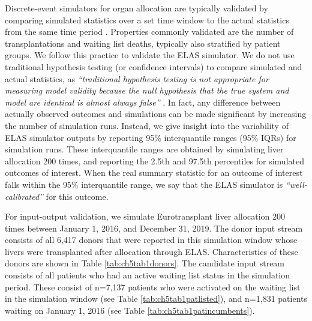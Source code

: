 \documentclass[11pt,twoside,]{book}
\begin{document}
Discrete-event simulators for organ allocation are typically validated
by comparing simulated statistics over a set time window to the actual
statistics from the same time period
\citep{ThompsonXSAM2004, shechterClinicallyBasedDiscreteEvent2005}. Properties commonly
validated are the number of transplantations and waiting list deaths,
typically also stratified by patient groups. We follow this practice to
validate the ELAS simulator. We do not use traditional hypothesis testing (or confidence intervals) to compare
simulated and actual statistics, as
\emph{``traditional hypothesis testing is not appropriate for measuring model validity
because the null hypothesis that the true system and model are identical is almost
always false''}
\citep{shechterClinicallyBasedDiscreteEvent2005}. In fact, any difference
between actually observed outcomes and simulations can be made
significant by increasing the number of simulation runs.
Instead, we give insight into the variability of ELAS simulator outputs
by reporting 95\% interquantile ranges (95\% IQRs) for simulation runs.
These interquantile ranges are obtained by simulating liver allocation
200 times, and reporting the 2.5th and 97.5th percentiles for simulated
outcomes of interest. When the real
summary statistic for an outcome of interest falls within the 95\%
interquantile range, we say that the ELAS simulator is
\emph{``well-calibrated''} for this outcome.

For input-output validation, we simulate Eurotransplant liver
allocation 200 times between January 1, 2016, and December 31, 2019.
The donor input stream consists of all 6,417 donors that were reported in this simulation window whose
livers were transplanted after allocation through ELAS. Characteristics of these
donors are shown in Table \ref{tab:ch5tab1donors}. The candidate input stream
consists of all patients who had an active waiting list status in the simulation
period. These consist of n=7,137 patients who were activated on the waiting list in the
simulation window (see Table \ref{tab:ch5tab1patlisted}),
and n=1,831 patients waiting on January 1, 2016 (see Table \ref{tab:ch5tab1patincumbents}).
\end{document}
